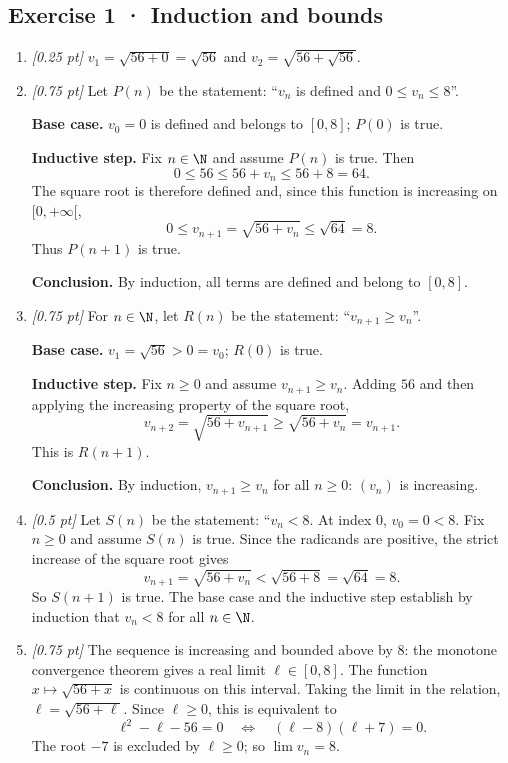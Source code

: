 \subsection*{Exercise 1 · Induction and bounds}\begin{enumerate}

\item \textit{[0.25 pt]} $v_1=\sqrt{56+0}=\sqrt{56}$ and $v_2=\sqrt{56+\sqrt{56}}$.

\item \textit{[0.75 pt]} Let $P(n)$ be the statement: ``$v_n$ is defined and $0\le v_n\le 8$''.
\par\smallskip\textbf{Base case.} $v_0=0$ is defined and belongs to $[0,8]$; $P(0)$ is true.
\par\smallskip\textbf{Inductive step.} Fix $n\in\N$ and assume $P(n)$ is true. Then
\[0\le 56\le 56+v_n\le 56+8=64.\]
The square root is therefore defined and, since this function is increasing on $[0,+\infty[$,
\[0\le v_{n+1}=\sqrt{56+v_n}\le\sqrt{64}=8.\]
Thus $P(n+1)$ is true.
\par\smallskip\textbf{Conclusion.} By induction, all terms are defined and belong to $[0,8]$.

\item \textit{[0.75 pt]} For $n\in\N$, let $R(n)$ be the statement: ``$v_{n+1}\ge v_n$''.
\par\smallskip\textbf{Base case.} $v_1=\sqrt{56}>0=v_0$; $R(0)$ is true.
\par\smallskip\textbf{Inductive step.} Fix $n\ge0$ and assume $v_{n+1}\ge v_n$. Adding $56$ and then applying the increasing property of the square root,
\[v_{n+2}=\sqrt{56+v_{n+1}}\ge\sqrt{56+v_n}=v_{n+1}.\]
This is $R(n+1)$.
\par\smallskip\textbf{Conclusion.} By induction, $v_{n+1}\ge v_n$ for all $n\ge0$: $(v_n)$ is increasing.

\item \textit{[0.5 pt]} Let $S(n)$ be the statement: ``$v_n<8$. At index $0$, $v_0=0<8$.
Fix $n\ge0$ and assume $S(n)$ is true. Since the radicands are positive, the strict increase of the square root gives
\[v_{n+1}=\sqrt{56+v_n}<\sqrt{56+8}=\sqrt{64}=8.\]
So $S(n+1)$ is true. The base case and the inductive step establish by induction that $v_n<8$ for all $n\in\N$.

\item \textit{[0.75 pt]} The sequence is increasing and bounded above by $8$: the monotone convergence theorem gives a real limit $\ell\in[0,8]$.
The function $x\mapsto\sqrt{56+x}$ is continuous on this interval. Taking the limit in the relation, $\ell=\sqrt{56+\ell}$. Since $\ell\ge0$, this is equivalent to
\[\ell^2-\ell-56=0\quad\Longleftrightarrow\quad(\ell-8)(\ell+7)=0.\]
The root $-7$ is excluded by $\ell\ge0$; so $\lim v_n=8$.


\end{enumerate}
